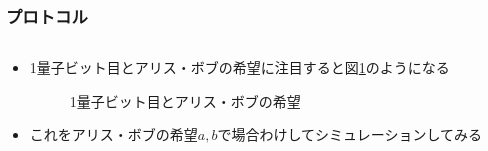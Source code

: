 \begin{frame}
  \frametitle{プロトコル}

  \begin{columns}
    \begin{column}{0.5\textwidth}
    \end{column}
    \begin{column}{0.5\textwidth}
    \end{column}
  \end{columns}

  \begin{itemize}
    \item 1量子ビット目とアリス・ボブの希望に注目すると図\ref{fig:1st_qubit}のようになる
    \begin{figure}
      \centering
      \vspace{2ex}
      \caption{1量子ビット目とアリス・ボブの希望}
      \label{fig:1st_qubit}
    \end{figure}

    \item これをアリス・ボブの希望$a, b$で場合わけしてシミュレーションしてみる
  \end{itemize}
\end{frame}

